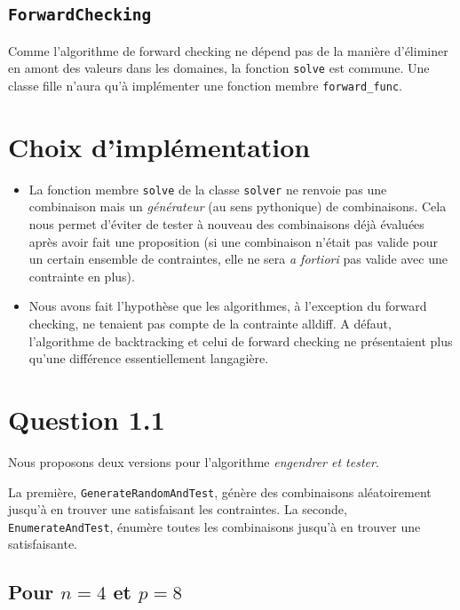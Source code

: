 \documentclass[a4paper, 12pt]{report}
\newcommand{\py}[1]{\texttt{#1}}
\begin{document}
\subsection*{\py{ForwardChecking}}

Comme l'algorithme de forward checking ne dépend pas de la manière d'éliminer en amont des valeurs dans les domaines, la fonction \py{solve} est commune. Une classe fille n'aura qu'à implémenter une fonction membre \py{forward_func}.



\section*{Choix d'implémentation}

\begin{itemize}
	\item La fonction membre \py{solve} de la classe \py{solver} ne renvoie pas une combinaison mais un \textit{générateur} (au sens pythonique) de combinaisons. Cela nous permet d'éviter de tester à nouveau des combinaisons déjà évaluées après avoir fait une proposition (si une combinaison n'était pas valide pour un certain ensemble de contraintes, elle ne sera \textit{a fortiori} pas valide avec une contrainte en plus).

	\item Nous avons fait l'hypothèse que les algorithmes, à l'exception du forward checking, ne tenaient pas compte de la contrainte alldiff. A défaut, l'algorithme de backtracking et celui de forward checking ne présentaient plus qu'une différence essentiellement langagière.
\end{itemize}



\section*{Question 1.1}

Nous proposons deux versions pour l'algorithme \textit{engendrer et tester}.

La première, \py{GenerateRandomAndTest}, génère des combinaisons aléatoirement jusqu'à en trouver une satisfaisant les contraintes. La seconde, \py{EnumerateAndTest}, énumère toutes les combinaisons jusqu'à en trouver une satisfaisante. \\

\subsection*{Pour $n = 4$ et $p = 8$}
\end{document}
